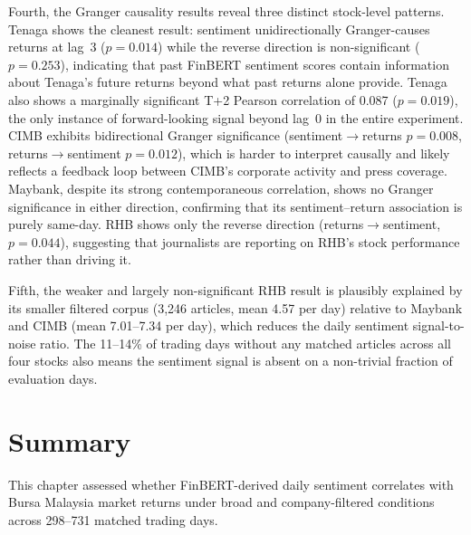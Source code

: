 \documentclass[12pt]{ucetd}
\begin{document}
Fourth, the Granger causality results reveal three distinct stock-level patterns. Tenaga shows the cleanest result: sentiment unidirectionally Granger-causes returns at lag~3 ($p = 0.014$) while the reverse direction is non-significant ($p = 0.253$), indicating that past FinBERT sentiment scores contain information about Tenaga's future returns beyond what past returns alone provide. Tenaga also shows a marginally significant T+2 Pearson correlation of 0.087 ($p = 0.019$), the only instance of forward-looking signal beyond lag~0 in the entire experiment. CIMB exhibits bidirectional Granger significance (sentiment$\to$returns $p = 0.008$, returns$\to$sentiment $p = 0.012$), which is harder to interpret causally and likely reflects a feedback loop between CIMB's corporate activity and press coverage. Maybank, despite its strong contemporaneous correlation, shows no Granger significance in either direction, confirming that its sentiment--return association is purely same-day. RHB shows only the reverse direction (returns$\to$sentiment, $p = 0.044$), suggesting that journalists are reporting on RHB's stock performance rather than driving it.

Fifth, the weaker and largely non-significant RHB result is plausibly explained by its smaller filtered corpus (3,246 articles, mean 4.57 per day) relative to Maybank and CIMB (mean 7.01--7.34 per day), which reduces the daily sentiment signal-to-noise ratio. The 11--14\% of trading days without any matched articles across all four stocks also means the sentiment signal is absent on a non-trivial fraction of evaluation days.

\section{Summary}

This chapter assessed whether FinBERT-derived daily sentiment correlates with Bursa Malaysia market returns under broad and company-filtered conditions across 298--731 matched trading days.
\end{document}
